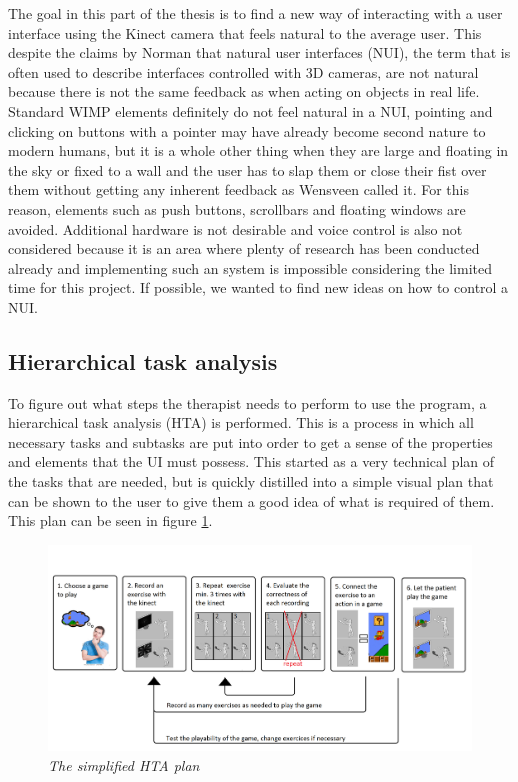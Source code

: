 The goal in this part of the thesis is to find a new way of interacting with a user interface using the Kinect camera that feels natural to the average user. This despite the claims by Norman \cite{Norman2010} that natural user interfaces (NUI), the term that is often used to describe interfaces controlled with 3D cameras, are not natural because there is not the same feedback as when acting on objects in real life. Standard WIMP elements definitely do not feel natural in a NUI, pointing and clicking on buttons with a pointer may have already become second nature to modern humans, but it is a whole other thing when they are large and floating in the sky or fixed to a wall and the user has to slap them or close their fist over them without getting any inherent feedback as Wensveen \cite{Wensveen2004} called it. For this reason, elements such as push buttons, scrollbars and floating windows are avoided. Additional hardware is not desirable and voice control is also not considered because it is an area where plenty of research has been conducted already and implementing such an system is impossible considering the limited time for this project. If possible, we wanted to find new ideas on how to control a NUI.\\


\subsection{Hierarchical task analysis}

To figure out what steps the therapist needs to perform to use the program, a hierarchical task analysis (HTA) is performed. This is a process in which all necessary tasks and subtasks are put into order to get a sense of the properties and elements that the UI must possess. This started as a very technical plan of the tasks that are needed, but is quickly distilled into a simple visual plan that can be shown to the user to give them a good idea of what is required of them. This plan can be seen in figure \ref{HTA}.\\

\begin{figure}[H]
	\begin{center}
		\includegraphics[width=14cm]{figures/HTA_plan.png}
		\caption{\emph{The simplified HTA plan}}
		\label{HTA}
	\end{center}
\end{figure}


